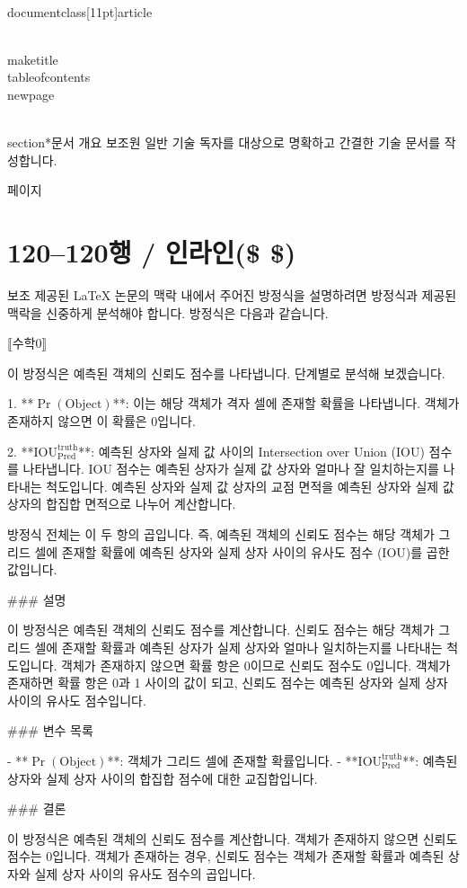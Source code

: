 \\documentclass[11pt]{article}
\begin{document}
\\maketitle
\\tableofcontents
\\newpage

\\section*{문서 개요}
보조원
일반 기술 독자를 대상으로 명확하고 간결한 기술 문서를 작성합니다.

\새 페이지

\section*{120–120행 / 인라인(\$ \$) }
보조
제공된 LaTeX 논문의 맥락 내에서 주어진 방정식을 설명하려면 방정식과 제공된 맥락을 신중하게 분석해야 합니다. 방정식은 다음과 같습니다.

⟦수학0⟧

이 방정식은 예측된 객체의 신뢰도 점수를 나타냅니다. 단계별로 분석해 보겠습니다.

1. **\(\Pr(\textrm{Object})\)**: 이는 해당 객체가 격자 셀에 존재할 확률을 나타냅니다. 객체가 존재하지 않으면 이 확률은 0입니다.

2. **\(\textrm{IOU}_{\textrm{Pred}}^{\textrm{truth}}\)**: 예측된 상자와 실제 값 사이의 Intersection over Union (IOU) 점수를 나타냅니다. IOU 점수는 예측된 상자가 실제 값 상자와 얼마나 잘 일치하는지를 나타내는 척도입니다. 예측된 상자와 실제 값 상자의 교점 면적을 예측된 상자와 실제 값 상자의 합집합 면적으로 나누어 계산합니다.

방정식 전체는 이 두 항의 곱입니다. 즉, 예측된 객체의 신뢰도 점수는 해당 객체가 그리드 셀에 존재할 확률에 예측된 상자와 실제 상자 사이의 유사도 점수 (IOU)를 곱한 값입니다.

### 설명

이 방정식은 예측된 객체의 신뢰도 점수를 계산합니다. 신뢰도 점수는 해당 객체가 그리드 셀에 존재할 확률과 예측된 상자가 실제 상자와 얼마나 일치하는지를 나타내는 척도입니다. 객체가 존재하지 않으면 확률 항은 0이므로 신뢰도 점수도 0입니다. 객체가 존재하면 확률 항은 0과 1 사이의 값이 되고, 신뢰도 점수는 예측된 상자와 실제 상자 사이의 유사도 점수입니다.

### 변수 목록

- **\(\Pr(\textrm{Object})\)**: 객체가 그리드 셀에 존재할 확률입니다.
- **\(\textrm{IOU}_{\textrm{Pred}}^{\textrm{truth}}\)**: 예측된 상자와 실제 상자 사이의 합집합 점수에 대한 교집합입니다.

### 결론

이 방정식은 예측된 객체의 신뢰도 점수를 계산합니다. 객체가 존재하지 않으면 신뢰도 점수는 0입니다. 객체가 존재하는 경우, 신뢰도 점수는 객체가 존재할 확률과 예측된 상자와 실제 상자 사이의 유사도 점수의 곱입니다.
\end{document}
